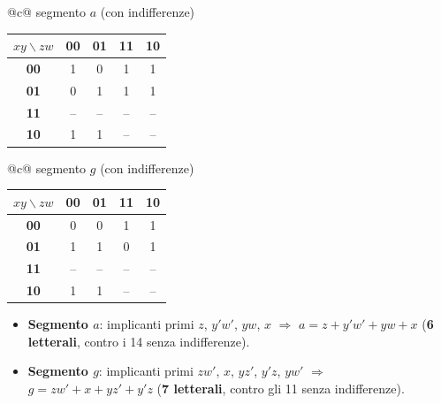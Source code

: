 \documentclass[12pt, a4paper]{article}
\begin{document}
\begin{center}
\renewcommand{\arraystretch}{1.25}
\begin{tabular}[t]{@{}c@{}}
segmento $a$ (con indifferenze)\\[3pt]
\begin{tabular}[t]{|c|c|c|c|c|}
\hline
\colorbox{gray!25}{\color{black}$xy\backslash zw$} & \colorbox{gray!25}{\color{black}\textbf{00}} & \colorbox{gray!25}{\color{black}\textbf{01}} & \colorbox{gray!25}{\color{black}\textbf{11}} & \colorbox{gray!25}{\color{black}\textbf{10}} \\ \hline
\colorbox{gray!25}{\color{black}\textbf{00}} & 1 & 0 & 1 & 1 \\ \hline
\colorbox{gray!25}{\color{black}\textbf{01}} & 0 & 1 & 1 & 1 \\ \hline
\colorbox{gray!25}{\color{black}\textbf{11}} & -- & -- & -- & -- \\ \hline
\colorbox{gray!25}{\color{black}\textbf{10}} & 1 & 1 & -- & -- \\ \hline
\end{tabular}
\end{tabular}
\qquad
\begin{tabular}[t]{@{}c@{}}
segmento $g$ (con indifferenze)\\[3pt]
\begin{tabular}[t]{|c|c|c|c|c|}
\hline
\colorbox{gray!25}{\color{black}$xy\backslash zw$} & \colorbox{gray!25}{\color{black}\textbf{00}} & \colorbox{gray!25}{\color{black}\textbf{01}} & \colorbox{gray!25}{\color{black}\textbf{11}} & \colorbox{gray!25}{\color{black}\textbf{10}} \\ \hline
\colorbox{gray!25}{\color{black}\textbf{00}} & 0 & 0 & 1 & 1 \\ \hline
\colorbox{gray!25}{\color{black}\textbf{01}} & 1 & 1 & 0 & 1 \\ \hline
\colorbox{gray!25}{\color{black}\textbf{11}} & -- & -- & -- & -- \\ \hline
\colorbox{gray!25}{\color{black}\textbf{10}} & 1 & 1 & -- & -- \\ \hline
\end{tabular}
\end{tabular}
\end{center}

\begin{itemize}
    \item \textbf{Segmento $a$}: implicanti primi $z$, $y'w'$, $yw$, $x$ $\Rightarrow$ $a = z + y'w' + yw + x$ \quad (\textbf{6 letterali}, contro i 14 senza indifferenze).
    \item \textbf{Segmento $g$}: implicanti primi $zw'$, $x$, $yz'$, $y'z$, $yw'$ $\Rightarrow$ $g = zw' + x + yz' + y'z$ \quad (\textbf{7 letterali}, contro gli 11 senza indifferenze).
\end{itemize}
\end{document}
